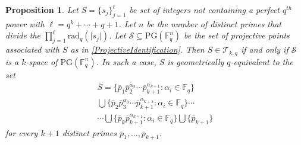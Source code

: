 \documentclass[12pt]{amsart}
\newtheorem{proposition}[theorem]{Proposition}
\newcommand{\F}{{\mathbb F}}
\newcommand{\PG}{\mathrm{PG}}
\newcommand{\rad}{\mathrm{rad}_q}
\begin{document}



\begin{proposition} \label{th:classification}
    Let $S=\{s_j\}_{j=1}^{\ell}$ be set of integers not containing a perfect $q^{th}$ power with $\ell=q^k+\cdots+q+1$. %
    Let $n$ be the number of distinct primes that divide the $\prod_{j=1}^{\ell}\rad(\lvert s_j\rvert)$. Let $\mathcal{S} \subseteq \PG(\F_q^n)$ be the set of projective points associated with $S$ as in \ref{ProjectiveIdentification}.
    Then $S \in \mathcal{T}_{k,q}$ if and only if $\mathcal{S}$ is a $k$-space of $\PG(\F_{q}^{n})$. In such a case, $S$ is geometrically $q$-equivalent to the set
        \begin{multline*} \label{lineexample}
        \overline{S}=\{\overline{p}_1\overline{p}_2^{\alpha_2}\cdots\overline{p}_{k+1}^{\alpha_{k+1}} \colon \alpha_i \in \F_q\} \\ \bigcup \{\overline{p}_2\overline{p}_3^{\alpha_3}\cdots\overline{p}_{k+1}^{\alpha_{k+1}} \colon  \alpha_i \in \F_q\} \cdots \\
         \cdots
         \bigcup \{\overline{p}_k\overline{p}_{k+1}^{\alpha_{k+1}} \colon  \alpha_i \in \F_q\} 
         \bigcup \{\overline{p}_{k+1}\}
        \end{multline*}
    for every $k+1$ distinct primes $\overline{p}_1,\ldots,\overline{p}_{k+1}$. 
\end{proposition}
\end{document}

